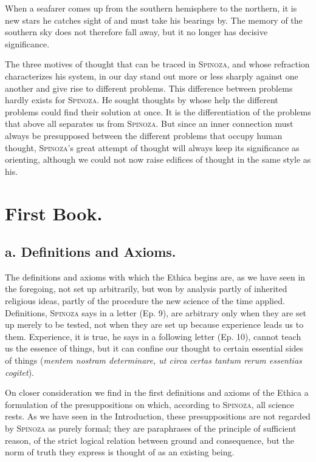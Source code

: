\documentclass[12pt]{article}
\newcommand{\opage}[1]{\marginnote{\footnotesize\textit{[#1]}}}
\begin{document}
When a seafarer comes up from the southern hemisphere to the northern, it is new
stars he catches sight of and must take his bearings by. The memory of the southern
sky does not therefore fall away, but it no longer has decisive significance.

The three motives of thought that can be traced in \textsc{Spinoza}, and whose
refraction characterizes his system, in our day stand out more or less sharply
against one another and give rise to different problems. This difference between
problems hardly exists for \textsc{Spinoza}. He sought thoughts by whose help the
different problems could find their solution at once. It is the differentiation of
the problems that above all separates us from \textsc{Spinoza}. But since an inner
connection must always be presupposed between the different problems that occupy
human thought, \textsc{Spinoza}'s great attempt of thought will always keep its
significance as orienting, although we could not now raise edifices of thought in the
same style as his.

\opage{14}\section*{First Book.}
\subsection*{a. Definitions and Axioms.}

The definitions and axioms with which the Ethica begins are, as we have seen in
the foregoing, not set up arbitrarily, but won by analysis partly of inherited
religious ideas, partly of the procedure the new science of the time applied.
Definitions, \textsc{Spinoza} says in a letter (Ep. 9), are arbitrary only when they
are set up merely to be tested, not when they are set up because experience leads
us to them. Experience, it is true, he says in a following letter (Ep. 10), cannot
teach us the essence of things, but it can confine our thought to certain essential
sides of things (\textit{mentem nostram determinare, ut circa certas tantum rerum
essentias cogitet}).

On closer consideration we find in the first definitions and axioms of the Ethica a
formulation of the presuppositions on which, according to \textsc{Spinoza}, all
science rests. As we have seen in the Introduction, these presuppositions are not
regarded by \textsc{Spinoza} as purely formal; they are paraphrases of the principle
of sufficient reason, of the strict logical relation between ground and consequence,
but the norm of truth they express is thought of as an existing being.
\end{document}
